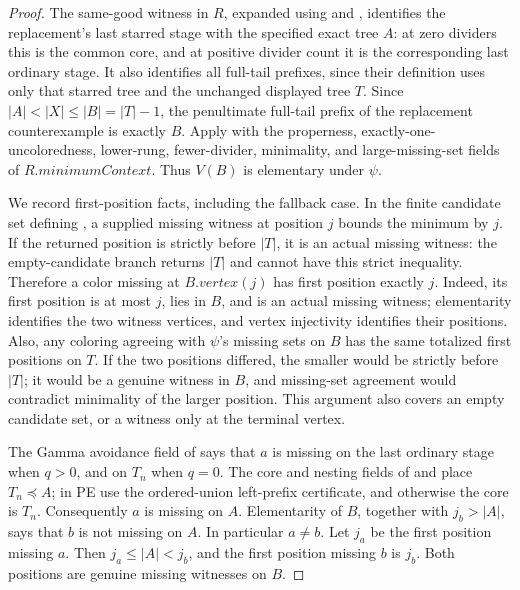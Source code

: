 \begin{proof}
The same-good witness in \(R\), expanded using
 and , identifies
the replacement's last starred stage with the specified exact tree \(A\):
at zero dividers this is the common core, and at positive divider count
it is the corresponding last ordinary stage. It also identifies all
full-tail prefixes, since their definition uses only that starred tree
and the unchanged displayed tree \(T\). Since
\(|A|<|X|\leq |B|=|T|-1\), the penultimate full-tail prefix of the
replacement counterexample is exactly \(B\). Apply
 with the
properness, exactly-one-uncoloredness, lower-rung, fewer-divider,
minimality, and large-missing-set fields of \(R.\mathit{minimumContext}\).
Thus \(V(B)\) is elementary under \(\psi\).

We record first-position facts, including the fallback case. In the
finite candidate set defining ,
a supplied missing witness at position \(j\) bounds the minimum by \(j\).
If the returned position is strictly before \(|T|\), it is an actual
missing witness: the empty-candidate branch returns \(|T|\) and cannot
have this strict inequality. Therefore a color missing at \(B.vertex(j)\)
has first position exactly \(j\). Indeed, its first position is at most
\(j\), lies in \(B\), and is an actual missing witness; elementarity
identifies the two witness vertices, and vertex injectivity identifies
their positions. Also, any coloring agreeing with \(\psi\)'s missing
sets on \(B\) has the same totalized first positions on \(T\). If the
two positions differed, the smaller would be strictly before \(|T|\);
it would be a genuine witness in \(B\), and missing-set agreement would
contradict minimality of the larger position. This argument also covers
an empty candidate set, or a witness only at the terminal vertex.

The Gamma avoidance field of  says that \(a\)
is missing on the last ordinary stage when \(q>0\), and on \(T_n\) when
\(q=0\). The core and nesting fields of  and
 place \(T_n\preccurlyeq A\); in PE use the
ordered-union left-prefix certificate, and otherwise the core is \(T_n\).
Consequently \(a\) is missing on \(A\). Elementarity of \(B\), together
with \(j_b>|A|\), says that \(b\) is not missing on \(A\). In particular
\(a\ne b\). Let \(j_a\) be the first position missing \(a\).
Then \(j_a\leq |A|<j_b\), and the first position missing \(b\) is \(j_b\).
Both positions are genuine missing witnesses on \(B\).


\end{proof}
